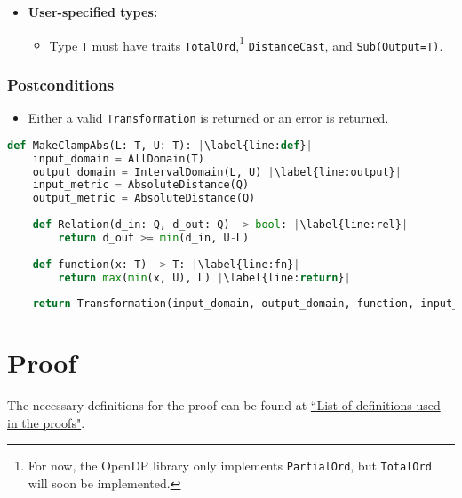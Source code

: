 \documentclass[11pt,a4paper]{article}
\theoremstyle{definition}
\begin{document}
\begin{itemize}
    \item \textbf{User-specified types:}
    \begin{itemize}
        \item Type \texttt{T} must have traits \texttt{TotalOrd},\footnote{For now, the OpenDP library only implements \texttt{PartialOrd}, but \texttt{TotalOrd} will soon be implemented.} \texttt{DistanceCast}, and \texttt{Sub(Output=T)}.
    \end{itemize}
\end{itemize}

\subsubsection*{Postconditions}
\begin{itemize}
    \item Either a valid \texttt{Transformation} is returned or an error is returned.
\end{itemize}

\begin{lstlisting}[language=Python, escapechar=|] 
def MakeClampAbs(L: T, U: T): |\label{line:def}|
    input_domain = AllDomain(T)
    output_domain = IntervalDomain(L, U) |\label{line:output}|
    input_metric = AbsoluteDistance(Q)
    output_metric = AbsoluteDistance(Q)
    
    def Relation(d_in: Q, d_out: Q) -> bool: |\label{line:rel}|
        return d_out >= min(d_in, U-L)
        
    def function(x: T) -> T: |\label{line:fn}|
        return max(min(x, U), L) |\label{line:return}|
    
    return Transformation(input_domain, output_domain, function, input_metric, output_metric, stability_relation = Relation)
\end{lstlisting}

\section{Proof}
The necessary definitions for the proof can be found at \href{https://www.overleaf.com/project/60d214e390b337703d200982}{``List of definitions used in the proofs"}.
\end{document}
